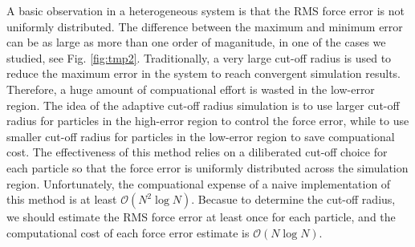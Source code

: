 \documentclass[aps,pre,preprint]{revtex4-1}
\begin{document}

A basic observation in a heterogeneous system is that the RMS force
error is not uniformly distributed. The difference between the maximum
and minimum error can be as large as more than one order of
maganitude, in one of the cases we studied, see
Fig. \ref{fig:tmp2}. Traditionally, a very large cut-off radius is
used to reduce the maximum error in the system to reach convergent
simulation results. Therefore, a huge amount of compuational effort is
wasted in the low-error region. The idea of the adaptive cut-off
radius simulation is to use larger cut-off radius for particles in the
high-error region to control the force error, while to use smaller
cut-off radius for particles in the low-error region to save
compuational cost.  The effectiveness of this method relies on a
diliberated cut-off choice for each particle so that the force error
is uniformly distributed across the simulation region.  Unfortunately,
the compuational expense of a naive implementation of this method is
at least $\mathcal O(N^2\log N)$.  Becasue to determine the cut-off
radius, we should estimate the RMS force error at least once for each
particle, and the computational cost of each force error estimate is
$\mathcal O(N \log N)$.


\end{document}
